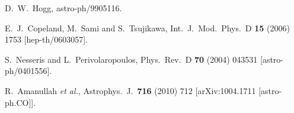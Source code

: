 \begin{thebibliography}{00}
 D.~W.~Hogg,
  astro-ph/9905116.
  
 E.~J.~Copeland, M.~Sami and S.~Tsujikawa,
  Int.\ J.\ Mod.\ Phys.\ D {\bf 15} (2006) 1753
[hep-th/0603057].

 S.~Nesseris and L.~Perivolaropoulos,
  Phys.\ Rev.\ D {\bf 70} (2004) 043531
[astro-ph/0401556].

 R.~Amanullah {\it et al.},
  Astrophys.\ J.\  {\bf 716} (2010) 712
[arXiv:1004.1711 [astro-ph.CO]].
\end{thebibliography}




